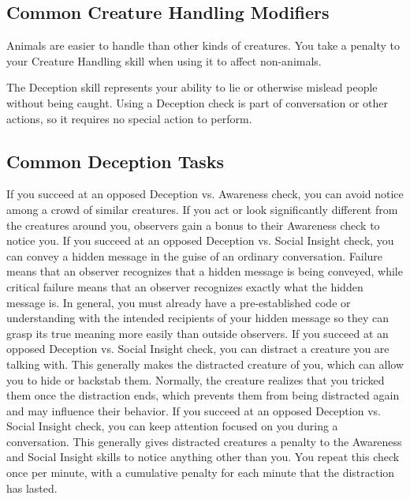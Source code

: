     \subsection{Common Creature Handling Modifiers}
        Animals are easier to handle than other kinds of creatures.
        You take a  penalty to your Creature Handling skill when using it to affect non-animals.

\newpage
{}
        The Deception skill represents your ability to lie or otherwise mislead people without being caught.
        Using a Deception check is part of conversation or other actions, so it requires no special action to perform.

    \subsection{Common Deception Tasks}
         If you succeed at an opposed Deception vs. Awareness check, you can avoid notice among a crowd of similar creatures.
        If you act or look significantly different from the creatures around you, observers gain a bonus to their Awareness check to notice you.
         If you succeed at an opposed Deception vs. Social Insight check, you can convey a hidden message in the guise of an ordinary conversation.
        Failure means that an observer recognizes that a hidden message is being conveyed, while critical failure means that an observer recognizes exactly what the hidden message is.
        In general, you must already have a pre-established code or understanding with the intended recipients of your hidden message so they can grasp its true meaning more easily than outside observers.
         If you succeed at an opposed Deception vs. Social Insight check, you can distract a creature you are talking with.
        This generally makes the distracted creature  \partiallyunaware of you, which can allow you to hide or backstab them.
        Normally, the creature realizes that you tricked them once the distraction ends, which prevents them from being distracted again and may influence their behavior.
         If you succeed at an opposed Deception vs. Social Insight check, you can keep attention focused on you during a conversation.
        This generally gives distracted creatures a  penalty to the Awareness and Social Insight skills to notice anything other than you.
        You repeat this check once per minute, with a cumulative  penalty for each minute that the distraction has lasted.
